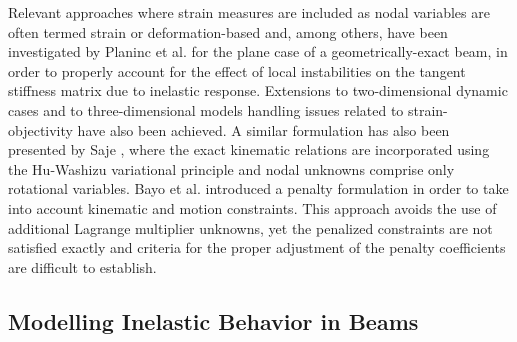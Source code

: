 Relevant approaches where strain measures are included as nodal variables are often
termed strain or deformation-based and, among others, have been
investigated by Planinc
et al. \cite{Planinc} for the plane case of a geometrically-exact beam, in
order to properly account for the effect of local instabilities on the tangent
stiffness matrix due to inelastic response. Extensions to two-dimensional
dynamic cases \cite{Gems} and to three-dimensional models \cite{Zupan}
handling issues related to strain-objectivity have also been
achieved. A similar formulation has also been presented by Saje \cite{Saje1},
where the exact kinematic relations are incorporated using the Hu-Washizu variational
principle and nodal unknowns comprise only rotational variables. Bayo et al.
\cite{Bayo} introduced a penalty formulation in order to take into account
kinematic and motion constraints. This approach avoids the use of additional
Lagrange multiplier unknowns, yet the penalized constraints are not
satisfied exactly and criteria for the proper adjustment of the penalty
coefficients are difficult to establish.

\subsection{Modelling Inelastic Behavior in Beams}

